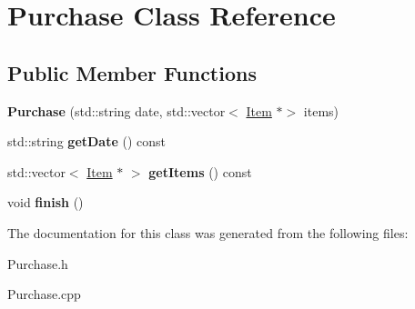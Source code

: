 \hypertarget{class_purchase}{}\section{Purchase Class Reference}
\label{class_purchase}
\subsection*{Public Member Functions}
\begin{DoxyCompactItemize}
\item 
\hypertarget{class_purchase_ab8bf2893fe6700bb2861d2a24077e94d}{}\label{class_purchase_ab8bf2893fe6700bb2861d2a24077e94d} 
{\bfseries Purchase} (std\+::string date, std\+::vector$<$ \hyperlink{class_item}{Item} $\ast$$>$ items)
\item 
\hypertarget{class_purchase_a71486b3a59cdd967f4f5848afd7265c3}{}\label{class_purchase_a71486b3a59cdd967f4f5848afd7265c3} 
std\+::string {\bfseries get\+Date} () const
\item 
\hypertarget{class_purchase_a1cea061239c72184a8858e8a68545051}{}\label{class_purchase_a1cea061239c72184a8858e8a68545051} 
std\+::vector$<$ \hyperlink{class_item}{Item} $\ast$ $>$ {\bfseries get\+Items} () const
\item 
\hypertarget{class_purchase_a2f380f9cdedc9c35058c23ecf0976cb1}{}\label{class_purchase_a2f380f9cdedc9c35058c23ecf0976cb1} 
void {\bfseries finish} ()
\end{DoxyCompactItemize}


The documentation for this class was generated from the following files\+:\begin{DoxyCompactItemize}
\item 
Purchase.\+h\item 
Purchase.\+cpp\end{DoxyCompactItemize}
